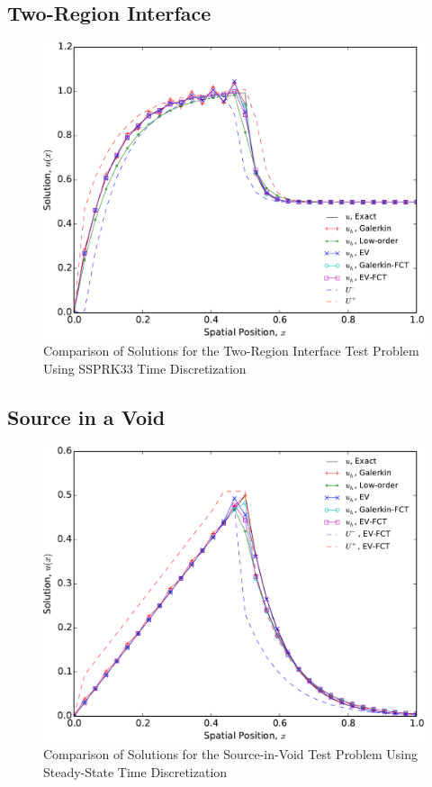 \subsection{Two-Region Interface}
\begin{figure}[htb]
   \centering
      \includegraphics[width=\textwidth]
        {images/solution_interface.pdf}
      \caption{Comparison of Solutions for the Two-Region Interface Test
       Problem Using SSPRK33 Time Discretization}
   \label{fig:interface}
\end{figure}
\clearpage
\subsection{Source in a Void}
\begin{figure}[htb]
   \centering
      \includegraphics[width=\textwidth]
        {images/solution_source_in_void.pdf}
      \caption{Comparison of Solutions for the Source-in-Void Test
       Problem Using Steady-State Time Discretization}
   \label{fig:source_}
\end{figure}
\clearpage
